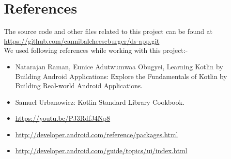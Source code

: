 \documentclass[11pt,a4paper]{report}
\begin{document}
		\section*{References}
		\vskip 1cm
		{\large{The source code and other files related to this project can  be found at}\\
		\url{https://github.com/cannibalcheeseburger/ds-app.git}\\
		\vskip 1cm
		\large{We used following references while working with this project:-}
		\begin{itemize}
		    \item  Natarajan Raman, Eunice Adutwumwaa Obugyei, Learning Kotlin by Building Android Applications: Explore the Fundamentals of Kotlin by Building Real-world Android Applications.
		    \item Samuel Urbanowicz: Kotlin Standard Library Cookbook.
		    \item \url{https://youtu.be/PJ3RdfJ4Np8}
		    \item \url{http://developer.android.com/reference/packages.html}
		    \item \url{http://developer.android.com/guide/topics/ui/index.html}
		\end{itemize}
		}
		
		
\end{document}
